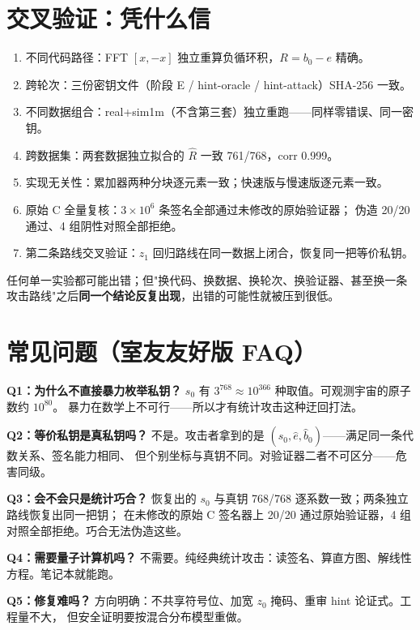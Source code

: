 \documentclass[11pt,a4paper]{ctexart}
\begin{document}
\section{交叉验证：凭什么信}

\begin{enumerate}
\item 不同代码路径：FFT $[x,-x]$ 独立重算负循环积，$R=b_0-e$ 精确。
\item 跨轮次：三份密钥文件（阶段 E / hint-oracle / hint-attack）SHA-256 一致。
\item 不同数据组合：real+sim1m（不含第三套）独立重跑——同样零错误、同一密钥。
\item 跨数据集：两套数据独立拟合的 $\hat R$ 一致 761/768，corr 0.999。
\item 实现无关性：累加器两种分块逐元素一致；快速版与慢速版逐元素一致。
\item 原始 C 全量复核：$3\times10^6$ 条签名全部通过未修改的原始验证器；
伪造 20/20 通过、4 组阴性对照全部拒绝。
\item 第二条路线交叉验证：$z_1$ 回归路线在同一数据上闭合，恢复同一把等价私钥。
\end{enumerate}

\begin{intuition}
任何单一实验都可能出错；但"换代码、换数据、换轮次、换验证器、甚至换一条
攻击路线"之后\textbf{同一个结论反复出现}，出错的可能性就被压到很低。
\end{intuition}

\section{常见问题（室友友好版 FAQ）}

\textbf{Q1：为什么不直接暴力枚举私钥？}
$s_0$ 有 $3^{768}\approx10^{366}$ 种取值。可观测宇宙的原子数约 $10^{80}$。
暴力在数学上不可行——所以才有统计攻击这种迂回打法。

\textbf{Q2：等价私钥是真私钥吗？}
不是。攻击者拿到的是 $(s_0, \hat e, \hat b_0)$——满足同一条代数关系、签名能力相同、
但个别坐标与真钥不同。对验证器二者不可区分——危害同级。

\textbf{Q3：会不会只是统计巧合？}
恢复出的 $s_0$ 与真钥 768/768 逐系数一致；两条独立路线恢复出同一把钥；
在未修改的原始 C 签名器上 20/20 通过原始验证器，4 组对照全部拒绝。巧合无法伪造这些。

\textbf{Q4：需要量子计算机吗？}
不需要。纯经典统计攻击：读签名、算直方图、解线性方程。笔记本就能跑。

\textbf{Q5：修复难吗？}
方向明确：不共享符号位、加宽 $z_0$ 掩码、重审 hint 论证式。工程量不大，
但安全证明要按混合分布模型重做。
\end{document}
